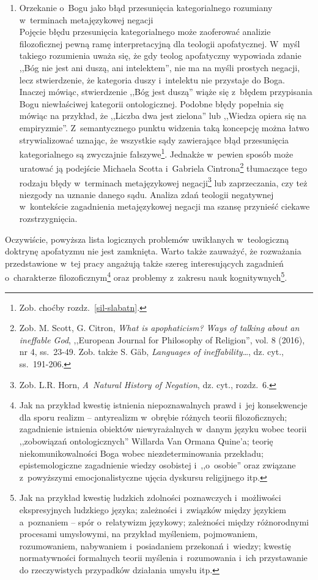\begin{enumerate}[label = \arabic*), itemindent=6mm, labelwidth=4mm, labelsep=2mm, itemsep=1em, leftmargin=0mm]
\item Orzekanie o~Bogu jako błąd przesunięcia kategorialnego rozumiany w~terminach metajęzykowej negacji\\
Pojęcie błędu przesunięcia kategorialnego może zaoferować analizie filozoficznej pewną ramę interpretacyjną dla teologii apofatycznej. W~myśl takiego rozumienia uważa się, że gdy teolog apofatyczny wypowiada zdanie ,,Bóg nie jest ani duszą, ani intelektem'', nie ma na myśli prostych negacji, lecz stwierdzenie, że kategoria duszy i~intelektu nie przystaje do Boga. Inaczej mówiąc, stwierdzenie ,,Bóg jest duszą'' wiąże się z~błędem przypisania Bogu niewłaściwej kategorii ontologicznej. Podobne błędy popełnia się mówiąc na przykład, że ,,Liczba dwa jest zielona'' lub ,,Wiedza opiera się na empiryzmie''. Z~semantycznego punktu widzenia taką koncepcję można łatwo strywializować uznając, że wszystkie sądy zawierające błąd przesunięcia kategorialnego są zwyczajnie fałszywe\footnote{Zob. choćby rozdz.~\ref{sil-slabatn}.}. Jednakże w~pewien sposób może uratować ją podejście Michaela Scotta i~Gabriela Cintrona\footnote{Zob. M. Scott, G. Citron, \textit{What is apophaticism? Ways of talking about an ineffable God}, ,,European Journal for Philosophy of Religion'', vol. 8 (2016), nr 4, ss.~23-49. Zob. także S. Gäb, \textit{Languages of ineffability}…, dz. cyt., ss.~191-206.} tłumaczące tego rodzaju błędy w~terminach metajęzykowej negacji\footnote{Zob. L.R. Horn, \textit{A~Natural History of Negation}, dz. cyt., rozdz.~6.} lub zaprzeczania, czy też niezgody na uznanie danego sądu. Analiza zdań teologii negatywnej w~kontekście zagadnienia metajęzykowej negacji ma szansę przynieść ciekawe rozstrzygnięcia.
\end{enumerate}

Oczywiście, powyższa lista logicznych problemów uwikłanych w~teologiczną doktrynę apofatyzmu nie jest zamknięta. Warto także zauważyć, że rozważania przedstawione w~tej pracy angażują także szereg interesujących zagadnień o~charakterze filozoficznym\footnote{Jak na przykład kwestię istnienia niepoznawalnych prawd i~jej konsekwencje dla sporu realizm -- antyrealizm w~obrębie różnych teorii filozoficznych; zagadnienie istnienia obiektów niewyrażalnych w~danym języku wobec teorii ,,zobowiązań ontologicznych'' Willarda Van Ormana Quine'a; teorię niekomunikowalności Boga wobec niezdeterminowania przekładu; epistemologiczne zagadnienie wiedzy osobistej i~,,o~osobie'' oraz związane z~powyższymi emocjonalistyczne ujęcia dyskursu religijnego itp.} oraz problemy z~zakresu nauk kognitywnych\footnote{Jak na przykład kwestię ludzkich zdolności poznawczych i~możliwości ekspresyjnych ludzkiego języka; zależności i~związków między językiem a~poznaniem -- spór o~relatywizm językowy; zależności między różnorodnymi procesami umysłowymi, na przykład myśleniem, pojmowaniem, rozumowaniem, nabywaniem i~posiadaniem przekonań i~wiedzy; kwestię normatywności formalnych teorii myślenia i~rozumowania i~ich przystawanie do rzeczywistych przypadków działania umysłu itp.}.

